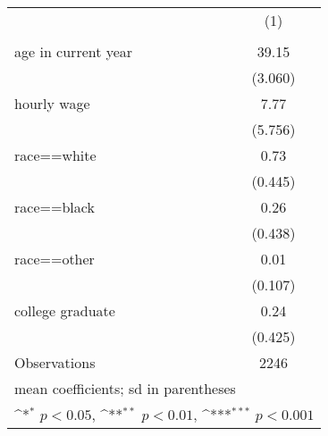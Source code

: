 {
\def\sym#1{\ifmmode^{#1}\else\(^{#1}\)\fi}
\begin{tabular}{l*{1}{c}}
\hline\hline
                    &\multicolumn{1}{c}{(1)}\\
                    &\multicolumn{1}{c}{} \\
\hline
age in current year &       39.15         \\
                    &     (3.060)         \\
[1em]
hourly wage         &        7.77         \\
                    &     (5.756)         \\
[1em]
race==white         &        0.73         \\
                    &     (0.445)         \\
[1em]
race==black         &        0.26         \\
                    &     (0.438)         \\
[1em]
race==other         &        0.01         \\
                    &     (0.107)         \\
[1em]
college graduate    &        0.24         \\
                    &     (0.425)         \\
\hline
Observations        &        2246         \\
\hline\hline
\multicolumn{2}{l}{\footnotesize mean coefficients; sd in parentheses}\\
\multicolumn{2}{l}{\footnotesize \sym{*} \(p<0.05\), \sym{**} \(p<0.01\), \sym{***} \(p<0.001\)}\\
\end{tabular}
}
